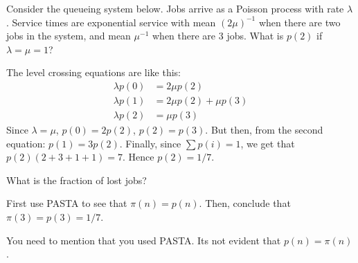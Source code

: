 \begin{exercise}[201807]\label{ex:86}
Consider the queueing system below. Jobs arrive as a Poisson process with rate $\lambda$. Service times are exponential service with  mean $(2\mu)^{-1}$ when there are two jobs in the system, and mean $\mu^{-1}$ when there are 3 jobs. What is $p(2)$ if $\lambda=\mu=1$?

\begin{center}
\end{center}


\begin{solution}
The  level crossing equations are like this:
  \begin{align*}
    \lambda p(0)  &= 2\mu p(2) \\
    \lambda p(1)  &= 2\mu p(2) +\mu p(3) \\
    \lambda p(2)  &= \mu p(3) 
  \end{align*}
Since $\lambda=\mu$,  $p(0) = 2p(2)$, $p(2) = p(3)$. But then, from the second equation: $p(1) = 3p(2)$. Finally, since $\sum p(i) = 1$, we get that $p(2)(2+3+1+1)=7$. Hence $p(2)=1/7$. 
\end{solution}
\end{exercise}


\begin{exercise}[201807] 
What is the fraction of lost jobs?
\begin{solution}
    First use PASTA to see that $\pi(n) = p(n)$. Then, conclude that $\pi(3) = p(3) = 1/7$. 

You need to mention that you used PASTA. Its not evident that $p(n)=\pi(n)$. 
\end{solution}
\end{exercise}


